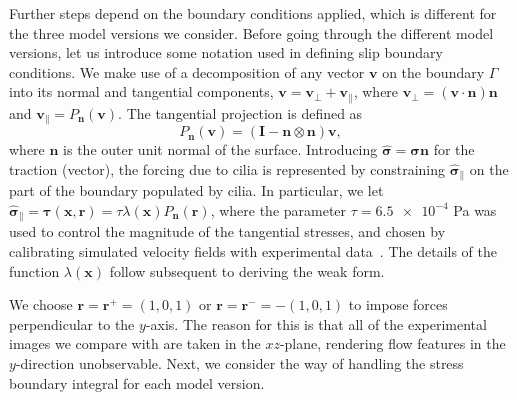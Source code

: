 \documentclass[fleqn]{wlscirep}
\newcommand{\nn}{\mathbf{n}}
\newcommand{\rr}{\mathbf{r}}
\newcommand{\vv}{\mathbf{v}}
\newcommand{\xx}{\bm{x}}
\newcommand{\bsig}{\bm{\sigma}}
\newcommand{\bsigpar}{\hat{\bsig}_{\parallel}}
\newcommand{\btau}{\bm{\tau}}
\begin{document}
Further steps depend on the boundary conditions applied, which is different for the three model versions we consider. Before going through the different model versions, let us introduce some notation used in defining slip boundary conditions. We make use of a decomposition
of any vector $\vv$ on the boundary $\Gamma$ into its normal and tangential components,
$\vv = \vv_{\perp} + \vv_{\parallel}$, where $\vv_{\perp}=(\vv\cdot\nn)\nn$ and
$\vv_{\parallel}=P_{\nn}(\vv)$. The tangential projection is defined as
\begin{equation}
    P_{\nn}(\vv) = (\mathbf{I} - \nn\otimes\nn)\vv,
    \label{eq:projection_operator_appendix}
\end{equation}
where $\nn$ is the outer unit normal of the surface. Introducing $\hat{\bsig} = \bsig\nn$ for the traction (vector), the forcing due to cilia is represented by constraining $\bsigpar$ on the part of the boundary populated by cilia. In particular, we let $\bsigpar = \btau(\xx, \rr) = \tau\lambda(\xx) P_{\nn}(\rr)$, where the parameter $\tau=\num{6.5e-4}$ Pa was used to control the magnitude of the tangential stresses, and chosen by calibrating simulated velocity fields with experimental data~\cite{Olstad2019CiliaryDevelopment}. The details of the function $\lambda(\xx)$ follow subsequent to deriving the weak form.

We choose $\mathbf{r} = \rr^+ = (1, 0, 1)$ or $\mathbf{r} = \rr^- = -(1, 0, 1)$ to impose forces perpendicular to the $y$-axis. The reason for this is that all of the experimental images we compare with are taken in the $xz$-plane, rendering flow features in the $y$-direction unobservable. Next, we consider the way of handling the stress boundary integral for each model version. 

\end{document}
